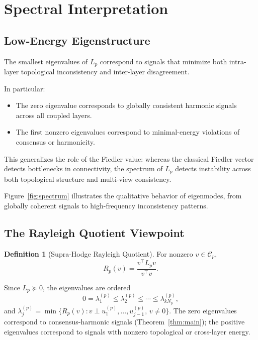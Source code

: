 \documentclass[11pt]{article}
\theoremstyle{definition}
\newtheorem{definition}[theorem]{Definition}
\theoremstyle{remark}
\newcommand{\Rp}{R_p}
\newcommand{\calC}{\mathcal{C}}
\begin{document}
\section{Spectral Interpretation}
\label{sec:spectral}

\subsection{Low-Energy Eigenstructure}

The smallest eigenvalues of $L_p$ correspond to signals that minimize both intra-layer topological inconsistency and inter-layer disagreement.

In particular:
\begin{itemize}
\item The zero eigenvalue corresponds to globally consistent harmonic signals across all coupled layers.
\item The first nonzero eigenvalues correspond to minimal-energy violations of consensus or harmonicity.
\end{itemize}

This generalizes the role of the Fiedler value: whereas the classical Fiedler vector detects bottlenecks in connectivity, the spectrum of $L_p$ detects instability across both topological structure and multi-view consistency.

Figure~\ref{fig:spectrum} illustrates the qualitative behavior of eigenmodes,
from globally coherent signals to high-frequency inconsistency patterns.

\FigureASeven

\subsection{The Rayleigh Quotient Viewpoint}

\begin{definition}[Supra-Hodge Rayleigh Quotient]
For nonzero $v\in\calC_p$,
\[
  \Rp(v) = \frac{v^\top L_p v}{v^\top v}.
\]
\end{definition}

Since $L_p\succeq 0$, the eigenvalues are ordered
\[
  0 = \lambda_1^{(p)} \leq \lambda_2^{(p)} \leq \cdots \leq \lambda_{kN_p}^{(p)},
\]
and $\lambda_j^{(p)} = \min\{\Rp(v) : v\perp u_1^{(p)},\dots,u_{j-1}^{(p)},\, v\neq 0\}$.
The zero eigenvalues correspond to consensus-harmonic signals
(Theorem~\ref{thm:main}); the positive eigenvalues correspond to signals with
nonzero topological or cross-layer energy.
\end{document}
